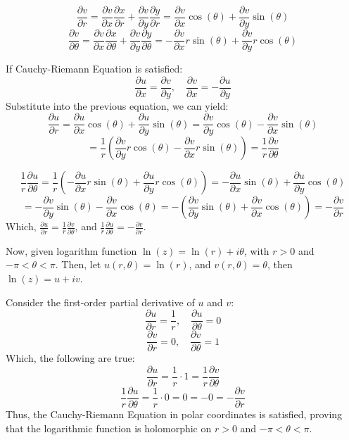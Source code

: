\documentclass{article}
\begin{document}
$$\frac{\partial v}{\partial r} = \frac{\partial v}{\partial x}\frac{\partial x}{\partial r}+\frac{\partial v}{\partial y}\frac{\partial y}{\partial r} = \frac{\partial v}{\partial x}\cos(\theta)+\frac{\partial v}{\partial y}\sin(\theta)$$
$$\frac{\partial v}{\partial \theta} = \frac{\partial v}{\partial x}\frac{\partial x}{\partial \theta}+\frac{\partial v}{\partial y}\frac{\partial y}{\partial \theta} = -\frac{\partial v}{\partial x}r\sin(\theta)+\frac{\partial v}{\partial y}r\cos(\theta)$$

If Cauchy-Riemann Equation is satisfied:
$$\frac{\partial u}{\partial x}=\frac{\partial v}{\partial y},\quad \frac{\partial v}{\partial x}=-\frac{\partial u}{\partial y}$$
Substitute into the previous equation, we can yield:
$$\frac{\partial u}{\partial r}=\frac{\partial u}{\partial x}\cos(\theta)+\frac{\partial u}{\partial y}\sin(\theta) = \frac{\partial v}{\partial y}\cos(\theta)-\frac{\partial v}{\partial x}\sin(\theta)$$
$$= \frac{1}{r}(\frac{\partial v}{\partial y}r\cos(\theta)-\frac{\partial v}{\partial x}r\sin(\theta)) = \frac{1}{r}\frac{\partial v}{\partial \theta}$$

$$\frac{1}{r}\frac{\partial u}{\partial \theta} = \frac{1}{r}(-\frac{\partial u}{\partial x}r\sin(\theta)+\frac{\partial u}{\partial y}r\cos(\theta)) = -\frac{\partial u}{\partial x}\sin(\theta)+\frac{\partial u}{\partial y}\cos(\theta)$$
$$ = -\frac{\partial v}{\partial y}\sin(\theta)-\frac{\partial v}{\partial x}\cos(\theta) = -(\frac{\partial v}{\partial y}\sin(\theta)+\frac{\partial v}{\partial x}\cos(\theta)) = -\frac{\partial v}{\partial r}$$
Which, $\frac{\partial u}{\partial r}=\frac{1}{r}\frac{\partial v}{\partial \theta}$, and $\frac{1}{r}\frac{\partial u}{\partial \theta}= -\frac{\partial v}{\partial r}$.

\hfill

\hfill

Now, given logarithm function $\ln(z)=\ln(r) + i\theta$, with $r>0$ and $-\pi <\theta <\pi$. Then, let $u(r,\theta)=\ln(r)$, and $v(r,\theta) = \theta$, then $\ln(z) = u+iv$.

Consider the first-order partial derivative of $u$ and $v$:
$$\frac{\partial u}{\partial r} = \frac{1}{r},\quad \frac{\partial u}{\partial \theta} = 0$$
$$\frac{\partial v}{\partial r} = 0,\quad \frac{\partial v}{\partial \theta} = 1$$
Which, the following are true:
$$\frac{\partial u}{\partial r} = \frac{1}{r}\cdot 1 = \frac{1}{r}\frac{\partial v}{\partial \theta}$$
$$\frac{1}{r}\frac{\partial u}{\partial \theta} = \frac{1}{r}\cdot 0 = 0 = -0 = -\frac{\partial v}{\partial r}$$
Thus, the Cauchy-Riemann Equation in polar coordinates is satisfied, proving that the logarithmic function is holomorphic on $r>0$ and $-\pi <\theta <\pi$.
\end{document}
